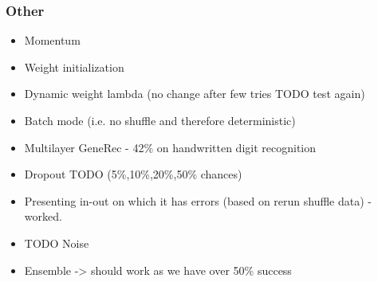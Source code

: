 
\subsubsection{Other} 
\begin{itemize} 
\item Momentum
\item Weight initialization 
\item Dynamic weight lambda (no change after few tries TODO test again) 
\item Batch mode (i.e. no shuffle and therefore deterministic)
\item Multilayer GeneRec - 42\% on handwritten digit recognition 
\item Dropout TODO (5\%,10\%,20\%,50\% chances)
\item Presenting in-out on which it has errors (based on rerun shuffle data) - worked. 
\item TODO Noise 
\item Ensemble -> should work as we have over 50\% success
\end{itemize} 
